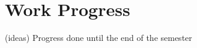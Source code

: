 \chapter{Work Progress}
\label{chapter:work_progress}

{\color{gray}
(ideas) Progress done until the end of the semester
}